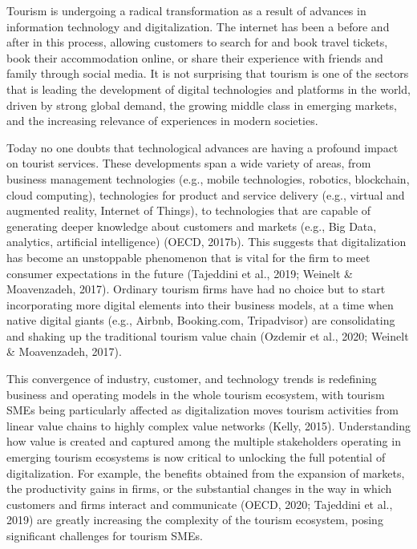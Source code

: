 \documentclass[
  letterpaper,
  DIV=11,
  numbers=noendperiod]{scrreprt}
\begin{document}
Tourism is undergoing a radical transformation as a result of advances
in information technology and digitalization. The internet has been a
before and after in this process, allowing customers to search for and
book travel tickets, book their accommodation online, or share their
experience with friends and family through social media. It is not
surprising that tourism is one of the sectors that is leading the
development of digital technologies and platforms in the world, driven
by strong global demand, the growing middle class in emerging markets,
and the increasing relevance of experiences in modern societies.

Today no one doubts that technological advances are having a profound
impact on tourist services. These developments span a wide variety of
areas, from business management technologies (e.g., mobile technologies,
robotics, blockchain, cloud computing), technologies for product and
service delivery (e.g., virtual and augmented reality, Internet of
Things), to technologies that are capable of generating deeper knowledge
about customers and markets (e.g., Big Data, analytics, artificial
intelligence) (OECD, 2017b). This suggests that digitalization has
become an unstoppable phenomenon that is vital for the firm to meet
consumer expectations in the future (Tajeddini et al., 2019; Weinelt \&
Moavenzadeh, 2017). Ordinary tourism firms have had no choice but to
start incorporating more digital elements into their business models, at
a time when native digital giants (e.g., Airbnb, Booking.com,
Tripadvisor) are consolidating and shaking up the traditional tourism
value chain (Ozdemir et al., 2020; Weinelt \& Moavenzadeh, 2017).

This convergence of industry, customer, and technology trends is
redefining business and operating models in the whole tourism ecosystem,
with tourism SMEs being particularly affected as digitalization moves
tourism activities from linear value chains to highly complex value
networks (Kelly, 2015). Understanding how value is created and captured
among the multiple stakeholders operating in emerging tourism ecosystems
is now critical to unlocking the full potential of digitalization. For
example, the benefits obtained from the expansion of markets, the
productivity gains in firms, or the substantial changes in the way in
which customers and firms interact and communicate (OECD, 2020;
Tajeddini et al., 2019) are greatly increasing the complexity of the
tourism ecosystem, posing significant challenges for tourism SMEs.
\end{document}
